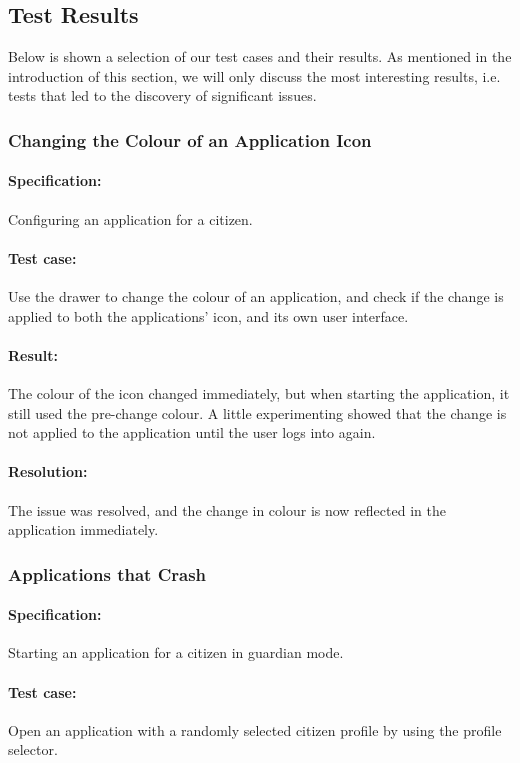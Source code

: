 \subsection{Test Results}\label{sec:sprint1:testing_results}
Below is shown a selection of our test cases and their results.
As mentioned in the introduction of this section, we will only discuss the most interesting results, i.e. tests that led to the discovery of significant issues.


\subsubsection{Changing the Colour of an Application Icon}

\paragraph{Specification:} Configuring an application for a citizen.
\paragraph{Test case:} Use the drawer to change the colour of an application, and check if the change is applied to both the applications' icon, and its own user interface.
\paragraph{Result:} The colour of the icon changed immediately, but when starting the application, it still used the pre-change colour. 
A little experimenting showed that the change is not applied to the application until the user logs into \launcher again.
\paragraph{Resolution:} The issue was resolved, and the change in colour is now reflected in the application immediately.

\subsubsection{Applications that Crash \launcher}

\paragraph{Specification:} Starting an application for a citizen in guardian mode.
\paragraph{Test case:} Open an application with a randomly selected citizen profile by using the profile selector.
